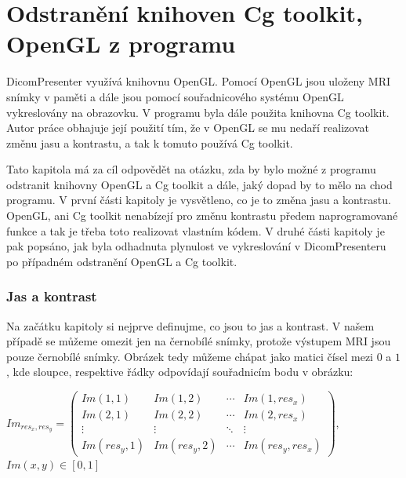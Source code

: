 \newpage
\chapter{Odstranění knihoven Cg toolkit, OpenGL z programu}
DicomPresenter využívá knihovnu OpenGL. Pomocí OpenGL jsou uloženy  MRI snímky v paměti a dále jsou pomocí souřadnicového systému OpenGL vykreslovány na obrazovku. V programu byla dále použita knihovna Cg toolkit. Autor práce \cite{neskudla} obhajuje její použití tím, že v OpenGL se mu nedaří realizovat změnu jasu a kontrastu, a tak k tomuto používá Cg toolkit.

Tato kapitola má za cíl odpovědět na otázku, zda by bylo možné z programu odstranit knihovny OpenGL a Cg toolkit a dále, jaký dopad by to mělo na chod programu. V první části kapitoly je vysvětleno, co je to změna jasu a kontrastu. OpenGL, ani Cg toolkit nenabízejí pro změnu kontrastu předem naprogramované funkce a tak je třeba toto realizovat vlastním kódem. V druhé části kapitoly je pak popsáno, jak byla odhadnuta plynulost ve vykreslování v DicomPresenteru po případném odstranění OpenGL a Cg toolkit.


\subsection{Jas  a kontrast}
Na začátku kapitoly si nejprve definujme, co jsou to jas a kontrast. V našem případě se můžeme omezit jen na černobílé snímky, protože výstupem MRI jsou pouze černobílé snímky. Obrázek tedy můžeme chápat jako matici čísel mezi $0$ a $1$, kde sloupce, respektive řádky odpovídají souřadnicím bodu v obrázku:

$
 Im_{res_{x},res_{y}} =
 \begin{pmatrix}
  Im(1,1) & Im(1,2) & \cdots & Im(1,res_{x}) \\
  Im(2,1) & Im(2,2) & \cdots & Im(2,res_{x}) \\
  \vdots  & \vdots  & \ddots & \vdots  \\
  Im(res_{y},1) & Im(res_{y},2) & \cdots & Im(res_{y},res_{x})
 \end{pmatrix}
$, $ Im(x,y) \in [0,1] $


